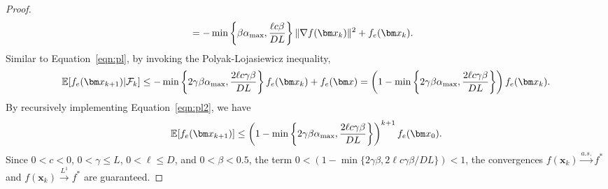 \documentclass[10pt]{article} %
\numberwithin{equation}{section}
\theoremstyle{plain}
\theoremstyle{definition}
\newcommand{\<}{\langle}
\renewcommand{\>}{\rangle}
\renewcommand{\(}{\left(}
\renewcommand{\)}{\right)}
\renewcommand{\[}{\left[}
\renewcommand{\]}{\right]}
\newcommand{\alphaMax}{\alpha_\textup{max}}
\newcommand{\Lip}{L}
\begin{document}
\begin{proof}
\begin{equation}
\begin{aligned}
&= -\min\left\{\beta \alphaMax,\frac{\ell c\beta}{D\Lip}\right\}\lVert \nabla f(\bm x_k)\rVert^2 + f_e(\bm x_k).
\end{aligned}
\end{equation}
Similar to Equation~\eqref{eqn:pl}, by invoking the Polyak-Lojasiewicz inequality,
\begin{equation}
\label{eqn:pl2}
\begin{aligned}
\mathbb{E}[f_e(\bm x_{k+1})\vert\mathcal{F}_k] 
\leq -\min\left\{2\gamma\beta \alphaMax,\frac{2\ell c\gamma\beta}{D\Lip}\right\}f_e(\bm x_k) + f_e(\bm x) 
= \left(1-\min\left\{2\gamma\beta \alphaMax,\frac{2\ell c\gamma\beta}{D\Lip}\right\}\right)f_e(\bm x_k).
\end{aligned}
\end{equation}
By recursively implementing Equation~\eqref{eqn:pl2}, we have
\begin{equation}
\label{eq:rec2}
\mathbb{E}[f_e(\bm x_{k+1})]
\leq \left(1-\min\left\{2\gamma\beta \alphaMax,\frac{2\ell c\gamma\beta}{D\Lip}\right\}\right)^{k+1}f_e(\bm x_0).
\end{equation}
Since $0 < c < 0$, $0 < \gamma\leq\Lip$, $0 < \ell\leq D$, and $0 < \beta< 0.5$, the term $0 < \left(1-\min\{2\gamma\beta,2\ell c\gamma\beta/D\Lip\}\right) < 1$, the convergences $f(\bm x_k)\overset{a.s.}{\to}f^*$ and $f(\bm x_k)\overset{L^1}{\to}f^*$ are guaranteed.
\end{proof}
\end{document}
